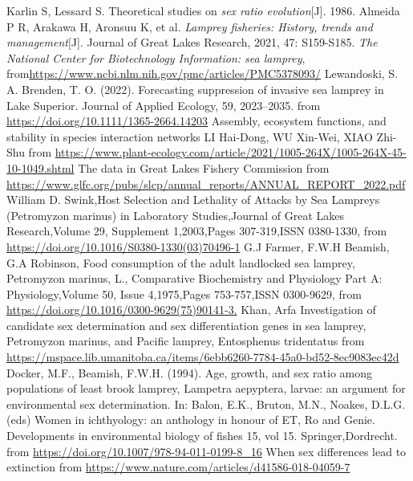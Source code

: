 \documentclass[12pt]{article}  %
\begin{document}
\newpage
\begin{thebibliography}{99}
 Karlin S, Lessard S. Theoretical studies on \emph{sex ratio evolution}[J]. 1986.
 Almeida P R, Arakawa H, Aronsuu K, et al. \emph{Lamprey fisheries: History, trends and management}[J]. Journal of Great Lakes Research, 2021, 47: S159-S185.
 \emph{The National Center for Biotechnology Information: sea lamprey}, from\url{https://www.ncbi.nlm.nih.gov/pmc/articles/PMC5378093/}
 Lewandoski, S. A. Brenden, T. O. (2022). Forecasting suppression of invasive sea lamprey in Lake Superior. Journal of Applied Ecology, 59, 2023–2035. from \url{https://doi.org/10.1111/1365-2664.14203}
 Assembly, ecosystem functions, and stability in species interaction networks LI Hai-Dong, WU Xin-Wei, XIAO Zhi-Shu from \url{https://www.plant-ecology.com/article/2021/1005-264X/1005-264X-45-10-1049.shtml}
 The data in Great Lakes Fishery Commission from \url{https://www.glfc.org/pubs/slcp/annual_reports/ANNUAL_REPORT_2022.pdf}
 William D. Swink,Host Selection and Lethality of Attacks by Sea Lampreys (Petromyzon marinus) in Laboratory Studies,Journal of Great Lakes Research,Volume 29, Supplement 1,2003,Pages 307-319,ISSN 0380-1330, from \url{https://doi.org/10.1016/S0380-1330(03)70496-1}
 G.J Farmer, F.W.H Beamish, G.A Robinson,
Food consumption of the adult landlocked sea lamprey, Petromyzon marinus, L.,
Comparative Biochemistry and Physiology Part A: Physiology,Volume 50, Issue 4,1975,Pages 753-757,ISSN 0300-9629, from \url{https://doi.org/10.1016/0300-9629(75)90141-3.}
 Khan, Arfa Investigation of candidate sex determination and sex differentiation genes in sea lamprey, Petromyzon marinus, and Pacific lamprey, Entosphenus tridentatus from \url{https://mspace.lib.umanitoba.ca/items/6ebb6260-7784-45a0-bd52-8ec9083ec42d}
 Docker, M.F., Beamish, F.W.H. (1994). Age, growth, and sex ratio among populations of least brook lamprey, Lampetra aepyptera, larvae: an argument for environmental sex determination. In: Balon, E.K., Bruton, M.N., Noakes, D.L.G. (eds) Women in ichthyology: an anthology in honour of ET, Ro and Genie. Developments in environmental biology of fishes 15, vol 15. Springer,Dordrecht. from \url{https://doi.org/10.1007/978-94-011-0199-8_16}
 When sex differences lead to extinction from \url{https://www.nature.com/articles/d41586-018-04059-7}
\end{thebibliography}
\end{document}
